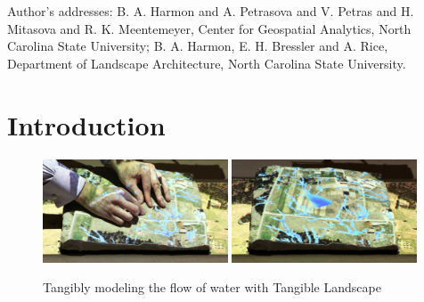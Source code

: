 \documentclass[prodmode,acmtochi]{acmsmall} %
\begin{document}
%
%



\begin{bottomstuff}
Author's addresses: B. A. Harmon {and} A. Petrasova {and} V. Petras {and} H. Mitasova {and} R. K. Meentemeyer, Center for Geospatial Analytics, North Carolina State University; B. A. Harmon, E. H. Bressler {and} A. Rice, Department of Landscape Architecture, North Carolina State University.
\end{bottomstuff}


\maketitle

\pagebreak

\section{Introduction}

\begin{figure}[h!]
\begin{center}
		\includegraphics[width=0.49\textwidth]{images/tl_sequence_2.jpg}
		\includegraphics[width=0.49\textwidth]{images/tl_sequence_3.jpg}
	\caption{Tangibly modeling the flow of water with Tangible Landscape}
	\label{fig:tl_flow}
\end{center}
\end{figure}
\end{document}
